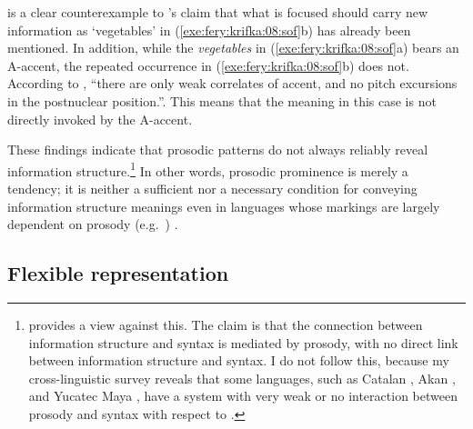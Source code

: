 

\noindent {} is a clear counterexample to
\citeauthor{halliday:67}'s claim that what is focused should carry new
information as `vegetables' in (\ref{exe:fery:krifka:08:sof}b) has
already been mentioned.  In addition, while the \textit{vegetables} in
(\ref{exe:fery:krifka:08:sof}a) bears an A-accent, the repeated
occurrence in (\ref{exe:fery:krifka:08:sof}b) does not.  According to
\citet[132]{fery:krifka:08}, ``there are only weak correlates of
accent, and no pitch excursions in the postnuclear position.''. 
This means that the  meaning in this case is
not directly invoked by the A-accent.




These findings indicate that prosodic patterns do not always reliably
reveal information structure.\footnote{\citet{fanselow:07} provides a
  view against this. The claim is that the connection between
  information structure and syntax is mediated by prosody,
  with no direct link between information structure and syntax.  I do
  not follow this, because my cross-linguistic survey reveals that
  some languages, such as Catalan \citep{engdahl:vallduvi:96}, Akan
  \citep{drubig:03}, and Yucatec Maya \citep{kugler:etal:07}, have a
  system with very weak or no interaction between prosody and syntax
  with respect to .} In other words, prosodic prominence is
merely a tendency; it is neither a sufficient nor a necessary
condition for conveying information structure meanings even in
languages whose markings are largely dependent on prosody
(e.g.\ ) \citep{rochemont:86,drubig:03}.





\subsection{Flexible representation}
\label{4:ssec:flexible}


